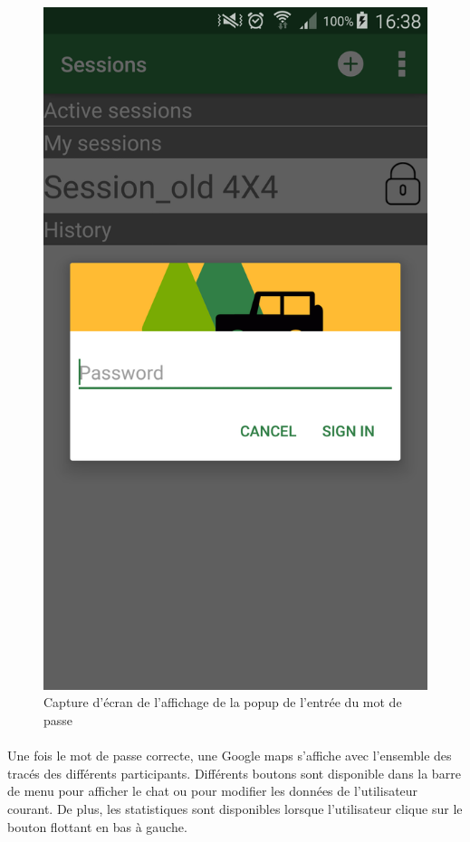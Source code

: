 \documentclass[titlepage, 12pt]{report}
\begin{document}
\begin{figure}[!h]
	\caption{Capture d'écran de l'affichage de la popup de l'entrée du mot de passe}
	\label{screenshots_password}
	\centering
	\includegraphics[scale=0.2]{Images/screenshots/password.png}
\end{figure}

\clearpage

\paragraph{}Une fois le mot de passe correcte, une Google maps s'affiche avec l'ensemble des tracés des différents participants. Différents boutons sont disponible dans la barre de menu pour afficher le chat ou pour modifier les données de l'utilisateur courant. De plus, les statistiques sont disponibles lorsque l'utilisateur clique sur le bouton flottant en bas à gauche.
\end{document}
